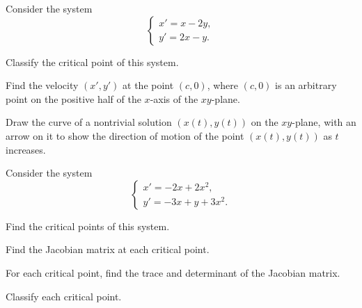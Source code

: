 \begin{problem}
Consider the system
\[
\begin{cases}
x'=x-2y,\\
y'=2x-y.
\end{cases}
\]
\begin{problemsubparts}
\item Classify the critical point of this system.
\item Find the velocity $(x',y')$ at the point $(c,0)$, where $(c,0)$ is an arbitrary point on the positive half of the $x$-axis of the $xy$-plane.
\item Draw the curve of a nontrivial solution $(x(t),y(t))$ on the $xy$-plane, with an arrow on it to show the direction of motion of the point $(x(t),y(t))$ as $t$ increases.
\end{problemsubparts}
\end{problem}

\begin{problem}
Consider the system
\[
\begin{cases}
x'=-2x+2x^2,\\
y'=-3x+y+3x^2.
\end{cases}
\]
\begin{problemsubparts}
\item Find the critical points of this system.
\item Find the Jacobian matrix at each critical point.
\item For each critical point, find the trace and determinant of the Jacobian matrix.
\item Classify each critical point.
\end{problemsubparts}
\end{problem}

